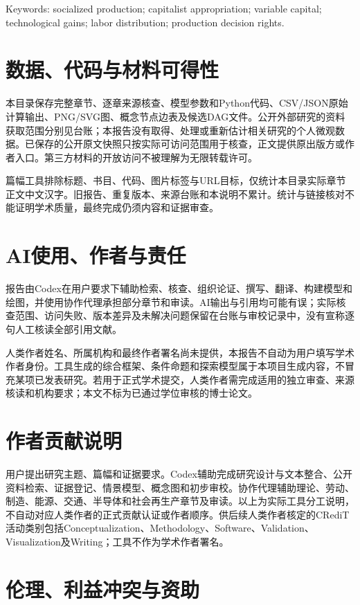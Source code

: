 \documentclass[UTF8,fontset=windows,12pt,a4paper,oneside,openany]{ctexbook}
\begin{document}
Keywords: socialized production; capitalist appropriation; variable capital; technological gains; labor distribution; production decision rights.

\section*{数据、代码与材料可得性}

本目录保存完整章节、逐章来源核查、模型参数和Python代码、CSV/JSON原始计算输出、PNG/SVG图、概念节点边表及候选DAG文件。公开外部研究的资料获取范围分别见台账；本报告没有取得、处理或重新估计相关研究的个人微观数据。已保存的公开原文快照只按实际可访问范围用于核查，正文提供原出版方或作者入口。第三方材料的开放访问不被理解为无限转载许可。

篇幅工具排除标题、书目、代码、图片标签与URL目标，仅统计本目录实际章节正文中文汉字。旧报告、重复版本、来源台账和本说明不累计。统计与链接核对不能证明学术质量，最终完成仍须内容和证据审查。

\section*{AI使用、作者与责任}

报告由Codex在用户要求下辅助检索、核查、组织论证、撰写、翻译、构建模型和绘图，并使用协作代理承担部分章节和审读。AI输出与引用均可能有误；实际核查范围、访问失败、版本差异及未解决问题保留在台账与审校记录中，没有宣称逐句人工核读全部引用文献。

人类作者姓名、所属机构和最终作者署名尚未提供，本报告不自动为用户填写学术作者身份。工具生成的综合框架、条件命题和探索模型属于本项目生成内容，不冒充某项已发表研究。若用于正式学术提交，人类作者需完成适用的独立审查、来源核读和机构要求；本文不标为已通过学位审核的博士论文。

\section*{作者贡献说明}

用户提出研究主题、篇幅和证据要求。Codex辅助完成研究设计与文本整合、公开资料检索、证据登记、情景模型、概念图和初步审校。协作代理辅助理论、劳动、制造、能源、交通、半导体和社会再生产章节及审读。以上为实际工具分工说明，不自动对应人类作者的正式贡献认证或作者顺序。供后续人类作者核定的CRediT活动类别包括Conceptualization、Methodology、Software、Validation、Visualization及Writing；工具不作为学术作者署名。

\section*{伦理、利益冲突与资助}
\end{document}
